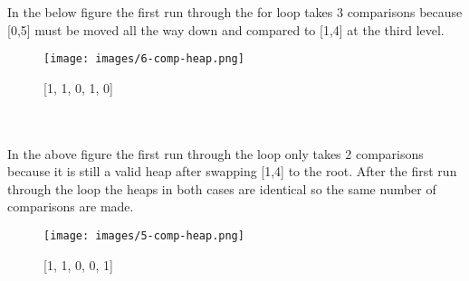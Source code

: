 \documentclass{article}
\begin{document}
In the below figure the first run through the for loop takes 3 comparisons because [0,5] must be moved all the way down and compared to [1,4] at the third level.
\begin{figure}
\centering
\texttt{[image: images/6-comp-heap.png]}
\caption{[1, 1, 0, 1, 0] \label{overflow}}
\end{figure}\\\\
In the above figure the first run through the loop only takes 2 comparisons because it is still a valid heap after swapping [1,4] to the root.  After the first run through the loop the heaps in both cases are identical so the same number of comparisons are made.
\begin{figure}
\centering
\texttt{[image: images/5-comp-heap.png]}
\caption{[1, 1, 0, 0, 1] \label{overflow}}
\end{figure}
\end{document}
